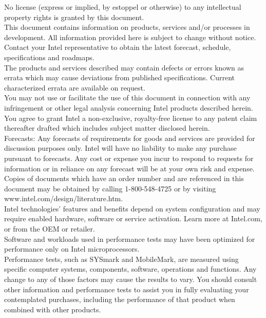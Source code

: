 No license (express or implied, by estoppel or otherwise) to any intellectual property rights is granted by this document. 
\newline \\
\noindent This document contains information on products, services and/or processes in development.  All information provided here is subject to change without notice. Contact your Intel representative to obtain the latest forecast, schedule, specifications and roadmaps.
\newline \\
\noindent The products and services described may contain defects or errors known as errata which may cause deviations from published specifications. Current characterized errata are available on request.
\newline \\
\noindent You may not use or facilitate the use of this document in connection with any infringement or other legal analysis concerning Intel products described herein. You agree to grant Intel a non-exclusive, royalty-free license to any patent claim thereafter drafted which includes subject matter disclosed herein.
\newline \\
\noindent Forecasts:  Any forecasts of requirements for goods and services are provided for discussion purposes only. Intel will have no liability to make any purchase pursuant to forecasts.  Any cost or expense you incur to respond to requests for information or in reliance on any forecast will be at your own risk and expense.
\newline \\
\noindent Copies of documents which have an order number and are referenced in this document may be obtained by calling 1-800-548-4725 or by visiting www.intel.com/design/literature.htm.
\newline \\
\noindent Intel technologies’ features and benefits depend on system configuration and may require enabled hardware, software or service activation. Learn more at Intel.com, or from the OEM or retailer.
\newline \\
\noindent Software and workloads used in performance tests may have been optimized for performance only on Intel microprocessors.
\newline \\
\noindent Performance tests, such as SYSmark and MobileMark, are measured using specific computer systems, components, software, operations and functions. Any change to any of those factors may cause the results to vary. You should consult other information and performance tests to assist you in fully evaluating your contemplated purchases, including the performance of that product when combined with other products.
